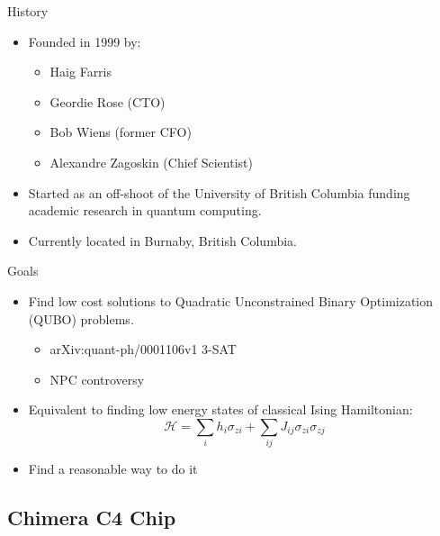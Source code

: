 \documentclass{beamer}
\begin{document}
\begin{frame}{History}
 \begin{itemize}
  \item Founded in 1999 by:
    \begin{itemize}
     \item Haig Farris
     \item Geordie Rose (CTO)
     \item Bob Wiens (former CFO)
     \item Alexandre Zagoskin (Chief Scientist)
    \end{itemize}
   \item Started as an off-shoot of the University of British Columbia funding academic research in quantum computing.
   \item Currently located in Burnaby, British Columbia.

 \end{itemize}

\end{frame}

\begin{frame}{Goals}
 
 \begin{itemize}
  \item Find low cost solutions to Quadratic Unconstrained Binary Optimization (QUBO) problems.
  \begin{itemize}
   \item arXiv:quant-ph/0001106v1 3-SAT
   \item NPC controversy
  \end{itemize}
  \item Equivalent to finding low energy states of classical Ising Hamiltonian: \[\mathcal{H} = \displaystyle\sum\limits_{i}h_i\sigma_{zi} + \displaystyle\sum\limits_{ij}J_{ij}\sigma_{zi}\sigma_{zj}\]
  \item Find a reasonable way to do it
 \end{itemize}

\end{frame}

\subsection{Chimera C4 Chip}
\end{document}
